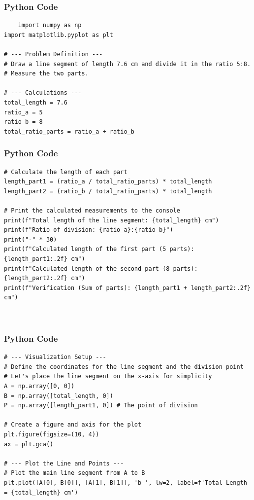 \documentclass{beamer}
\begin{document}
\begin{frame}[fragile]
    \frametitle{Python Code}
    \begin{lstlisting}
    import numpy as np
import matplotlib.pyplot as plt

# --- Problem Definition ---
# Draw a line segment of length 7.6 cm and divide it in the ratio 5:8.
# Measure the two parts.

# --- Calculations ---
total_length = 7.6
ratio_a = 5
ratio_b = 8
total_ratio_parts = ratio_a + ratio_b
    \end{lstlisting}
\end{frame}

\begin{frame}[fragile]
    \frametitle{Python Code}
    \begin{lstlisting}
# Calculate the length of each part
length_part1 = (ratio_a / total_ratio_parts) * total_length
length_part2 = (ratio_b / total_ratio_parts) * total_length

# Print the calculated measurements to the console
print(f"Total length of the line segment: {total_length} cm")
print(f"Ratio of division: {ratio_a}:{ratio_b}")
print("-" * 30)
print(f"Calculated length of the first part (5 parts): {length_part1:.2f} cm")
print(f"Calculated length of the second part (8 parts): {length_part2:.2f} cm")
print(f"Verification (Sum of parts): {length_part1 + length_part2:.2f} cm")

   
    \end{lstlisting}
\end{frame}

\begin{frame}[fragile]
    \frametitle{Python Code}
    \begin{lstlisting}
# --- Visualization Setup ---
# Define the coordinates for the line segment and the division point
# Let's place the line segment on the x-axis for simplicity
A = np.array([0, 0])
B = np.array([total_length, 0])
P = np.array([length_part1, 0]) # The point of division

# Create a figure and axis for the plot
plt.figure(figsize=(10, 4))
ax = plt.gca()

# --- Plot the Line and Points ---
# Plot the main line segment from A to B
plt.plot([A[0], B[0]], [A[1], B[1]], 'b-', lw=2, label=f'Total Length = {total_length} cm')
  
    \end{lstlisting}
\end{frame}
\end{document}
